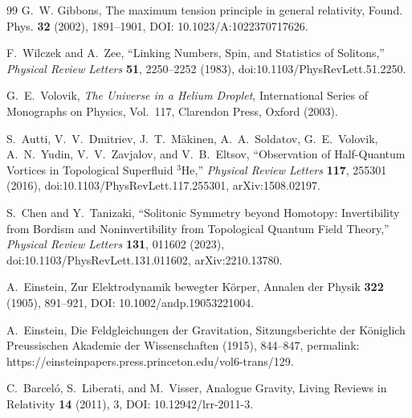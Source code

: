 \documentclass[11pt]{article}
\theoremstyle{definition}
\theoremstyle{plain}
\theoremstyle{remark}
\begin{document}
\begin{thebibliography}{99}
            G.~W. Gibbons,
            \newblock The maximum tension principle in general relativity,
            \newblock Found. Phys. \textbf{32} (2002), 1891--1901,
            \newblock DOI: 10.1023/A:1022370717626.

            F.~Wilczek and A.~Zee,
            \newblock ``Linking Numbers, Spin, and Statistics of Solitons,''
            \newblock \textit{Physical Review Letters} \textbf{51}, 2250--2252 (1983),
            \newblock doi:10.1103/PhysRevLett.51.2250.

            G.~E.~Volovik,
            \newblock \textit{The Universe in a Helium Droplet},
            \newblock International Series of Monographs on Physics, Vol.~117,
            \newblock Clarendon Press, Oxford (2003).

            S.~Autti, V.~V.~Dmitriev, J.~T.~M\"akinen, A.~A.~Soldatov,
            G.~E.~Volovik, A.~N.~Yudin, V.~V.~Zavjalov, and V.~B.~Eltsov,
            \newblock ``Observation of Half-Quantum Vortices in Topological Superfluid $^3$He,''
            \newblock \textit{Physical Review Letters} \textbf{117}, 255301 (2016),
            \newblock doi:10.1103/PhysRevLett.117.255301,
            \newblock arXiv:1508.02197.

            S.~Chen and Y.~Tanizaki,
            \newblock ``Solitonic Symmetry beyond Homotopy:
            Invertibility from Bordism and Noninvertibility from Topological Quantum Field Theory,''
            \newblock \textit{Physical Review Letters} \textbf{131}, 011602 (2023),
            \newblock doi:10.1103/PhysRevLett.131.011602,
            \newblock arXiv:2210.13780.

            A.~Einstein,
            \newblock Zur Elektrodynamik bewegter K{\"o}rper,
            \newblock Annalen der Physik \textbf{322} (1905), 891--921,
            \newblock DOI: 10.1002/andp.19053221004.

            A.~Einstein,
            \newblock Die Feldgleichungen der Gravitation,
            \newblock Sitzungsberichte der K{\"o}niglich Preussischen Akademie der Wissenschaften (1915), 844--847,
            \newblock permalink: https://einsteinpapers.press.princeton.edu/vol6-trans/129.

            C.~Barcel{\'o}, S.~Liberati, and M.~Visser,
            \newblock Analogue Gravity,
            \newblock Living Reviews in Relativity \textbf{14} (2011), 3,
            \newblock DOI: 10.12942/lrr-2011-3.


\end{thebibliography}
\end{document}
